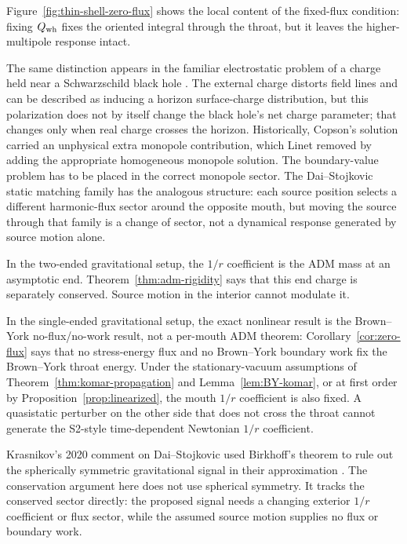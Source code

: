 \documentclass[aps,prd,10pt,onecolumn,nofootinbib,superscriptaddress,floatfix]{revtex4-2}
\begin{document}
Figure~\ref{fig:thin-shell-zero-flux} shows the local content of the
fixed-flux condition: fixing $Q_{\rm wh}$ fixes the oriented integral through
the throat, but it leaves the higher-multipole response intact.

The same distinction appears in the familiar electrostatic problem of a charge
held near a Schwarzschild black hole
\cite{Copson1928Electrostatics,HanniRuffini1973Lines,
Linet1976Electrostatics,PoissonPoundVega2011Motion}.  The external charge
distorts field lines and can be described as inducing a horizon surface-charge
distribution, but this polarization does not by itself change the black hole's
net charge parameter; that changes only when real charge crosses the horizon.
Historically, Copson's solution carried an unphysical extra monopole
contribution, which Linet removed by adding the appropriate homogeneous
monopole solution.  The boundary-value problem has to be placed in the correct
monopole sector.  The Dai--Stojkovic static matching
family has the analogous structure: each source position selects a different
harmonic-flux sector around the opposite mouth, but moving the source through
that family is a change of sector, not a dynamical response generated by source
motion alone.

In the two-ended gravitational setup, the $1/r$ coefficient is the ADM mass at
an asymptotic end.  Theorem~\ref{thm:adm-rigidity} says that this end charge is
separately conserved.  Source motion in the interior cannot modulate it.

In the single-ended gravitational setup, the exact nonlinear result is the
Brown--York no-flux/no-work result, not a per-mouth ADM theorem:
Corollary~\ref{cor:zero-flux} says that no stress-energy flux and no
Brown--York boundary work fix the Brown--York throat energy.  Under the
stationary-vacuum assumptions of Theorem~\ref{thm:komar-propagation} and
Lemma~\ref{lem:BY-komar}, or at first order by
Proposition~\ref{prop:linearized}, the mouth $1/r$ coefficient is also fixed.
A quasistatic perturber on the other side that does not cross the throat cannot
generate the S2-style time-dependent Newtonian $1/r$ coefficient.

Krasnikov's 2020 comment on Dai--Stojkovic used Birkhoff's theorem to rule out
the spherically symmetric gravitational signal in their approximation
\cite{Krasnikov2020CommentObserving}.  The conservation argument here does not
use spherical symmetry.  It tracks the conserved sector directly: the proposed
signal needs a changing exterior $1/r$ coefficient or flux sector, while the
assumed source motion supplies no flux or boundary work.
\end{document}
